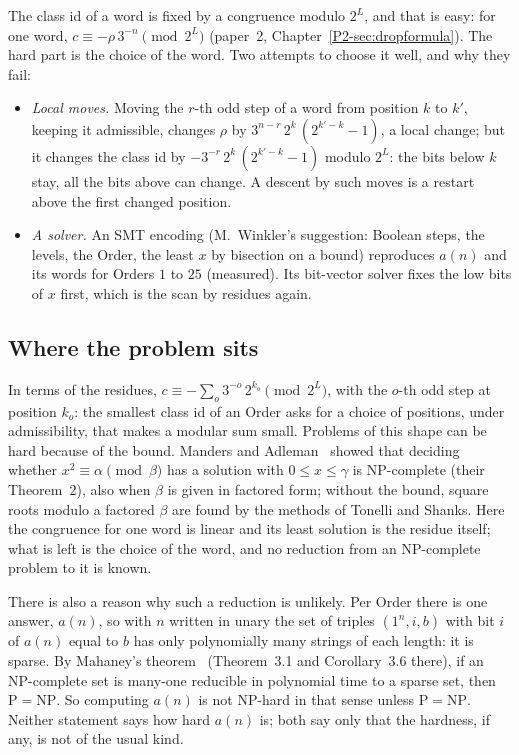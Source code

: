 \documentclass[10pt,a4paper,titlepage]{article}
\begin{document}
The class id of a word is fixed by a congruence modulo $2^L$, and that is easy: for one
word, $c \equiv -\rho\,3^{-n} \pmod{2^L}$ (paper~2, Chapter~\ref{P2-sec:dropformula}). The hard part is
the choice of the word. Two attempts to choose it well, and why they fail:
\begin{itemize}
\item \emph{Local moves.} Moving the $r$-th odd step of a word from position $k$ to $k'$,
  keeping it admissible, changes $\rho$ by $3^{n-r}\,2^k\,(2^{k'-k} - 1)$, a local change;
  but it changes the class id by $-3^{-r}\,2^k\,(2^{k'-k} - 1)$ modulo $2^L$: the bits below
  $k$ stay, all the bits above can change. A descent by such moves is a restart above
  the first changed position.
\item \emph{A solver.} An SMT encoding (M.~Winkler's suggestion: Boolean steps, the
  levels, the Order, the least $x$ by bisection on a bound) reproduces $a(n)$ and its words
  for Orders $1$ to $25$ (measured). Its bit-vector solver fixes the low bits of $x$ first,
  which is the scan by residues again.
\end{itemize}

\subsection*{Where the problem sits}

In terms of the residues, $c \equiv -\sum_o 3^{-o}\,2^{k_o} \pmod{2^L}$, with the $o$-th odd
step at position $k_o$: the smallest class id of an Order asks for a choice of positions,
under admissibility, that makes a modular sum small. Problems of this shape can be hard
because of the bound. Manders and Adleman~\cite{MandersAdleman1978} showed that deciding
whether $x^2 \equiv \alpha \pmod{\beta}$ has a solution with $0 \le x \le \gamma$ is
NP-complete (their Theorem~2), also when $\beta$ is given in factored form; without the
bound, square roots modulo a factored $\beta$ are found by the methods of Tonelli and Shanks. Here the congruence for one word is
linear and its least solution is the residue itself; what is left is the choice of the
word, and no reduction from an NP-complete problem to it is known.

There is also a reason why such a reduction is unlikely. Per Order there is one answer,
$a(n)$, so with $n$ written in unary the set of triples $(1^n, i, b)$ with bit $i$ of $a(n)$
equal to $b$ has only polynomially many strings of each length: it is sparse. By
Mahaney's theorem~\cite{Mahaney1982} (Theorem~3.1 and Corollary~3.6 there), if an
NP-complete set is many-one reducible in polynomial time to a sparse set, then
$\mathrm{P} = \mathrm{NP}$. So computing $a(n)$ is not NP-hard in that sense unless
$\mathrm{P} = \mathrm{NP}$. Neither statement says how hard $a(n)$ is; both say only that
the hardness, if any, is not of the usual kind.
\end{document}
